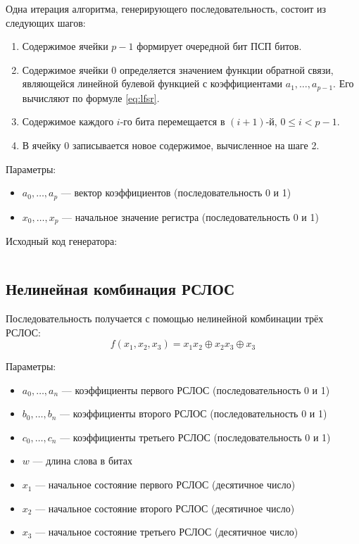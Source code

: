 \documentclass[spec, och, pract_otchet]{SCWorks}
\begin{document}
Одна итерация алгоритма, генерирующего последовательность, состоит из следующих
шагов:
\begin{enumerate}
  \item Содержимое ячейки $p - 1$ формирует очередной бит ПСП битов.
  \item
    Содержимое ячейки 0 определяется значением функции обратной связи,
    являющейся линейной булевой функцией с коэффициентами $a_1, \dots, a_{p -
    1}$. Его вычисляют по формуле \ref{eq:lfsr}.
  \item
    Содержимое каждого $i$-го бита перемещается в $(i + 1)$-й, $0 \leq i < p - 1$.
  \item В ячейку 0 записывается новое содержимое, вычисленное на шаге 2.
\end{enumerate}

Параметры:
\begin{itemize}
  \item $a_0,\dots,a_p$ --- вектор коэффициентов (последовательность 0 и 1)
  \item $x_0,\dots,x_p$ --- начальное значение регистра (последовательность 0 и 1)
\end{itemize}

Исходный код генератора:
\inputminted{rust}{../prng/src/lfsr.rs}

\subsection{Нелинейная комбинация РСЛОС}

Последовательность получается с помощью нелинейной комбинации трёх РСЛОС:
\begin{equation*}
  f(x_1, x_2, x_3) = x_1 x_2 \oplus x_2 x_3 \oplus x_3
\end{equation*}

Параметры:
\begin{itemize}
  \item $a_0,\dots,a_n$ --- коэффициенты первого РСЛОС (последовательность 0 и 1)
  \item $b_0,\dots,b_n$ --- коэффициенты второго РСЛОС (последовательность 0 и 1)
  \item $c_0,\dots,c_n$ --- коэффициенты третьего РСЛОС (последовательность 0 и 1)
  \item $w$ --- длина слова в битах
  \item $x_1$ --- начальное состояние первого РСЛОС (десятичное число)
  \item $x_2$ --- начальное состояние второго РСЛОС (десятичное число)
  \item $x_3$ --- начальное состояние третьего РСЛОС (десятичное число)
\end{itemize}
\end{document}

